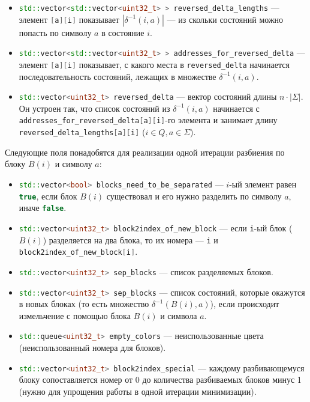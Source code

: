 \documentclass{article}
\begin{document}
\begin{itemize}
  \item \lstinline[language=C++]!std::vector<std::vector<uint32_t> > reversed_delta_lengths! --- элемент \lstinline[language=C++]![a][i]! показывает $|\delta^{-1}(i, a)|$ --- из скольки состояний можно попасть по символу $a$ в состояние $i$.
  \item \lstinline[language=C++]!std::vector<std::vector<uint32_t> > addresses_for_reversed_delta! --- элемент \lstinline[language=C++]![a][i]! показывает, с какого места в \lstinline[language=C++]!reversed_delta! начинается последовательность состояний, лежащих в множестве $\delta^{-1}(i, a)$.
  \item \lstinline[language=C++]!std::vector<uint32_t> reversed_delta! --- вектор состояний длины $n \cdot |\Sigma|$. Он устроен так, что список состояний из $\delta^{-1}(i, a)$ начинается с \lstinline[language=C++]!addresses_for_reversed_delta[a][i]!-го элемента и занимает длину \lstinline[language=C++]!reversed_delta_lengths[a][i]! ($i \in Q, a \in \Sigma$).
\end{itemize}
Следующие поля понадобятся для реализации одной итерации разбиения по блоку $B(i)$ и символу $a$:
\begin{itemize}
  \item \lstinline[language=C++]!std::vector<bool> blocks_need_to_be_separated! --- $i$-ый элемент равен \lstinline[language=C++]!true!, если блок $B(i)$ существовал и его нужно разделить по символу $a$, иначе \lstinline[language=C++]!false!.
  \item \lstinline[language=C++]!std::vector<uint32_t> block2index_of_new_block! --- если \lstinline[language=C++]!i!-ый блок ($B(i)$) разделяется на два блока, то их номера --- \lstinline[language=C++]!i! и \lstinline[language=C++]!block2index_of_new_block[i]!.
  \item \lstinline[language=C++]!std::vector<uint32_t> sep_blocks! --- список разделяемых блоков.
  \item \lstinline[language=C++]!std::vector<uint32_t> sep_blocks! --- список состояний, которые окажутся в новых блоках (то есть множество $\delta^{-1}(B(i), a)$), если происходит измельчение с помощью блока $B(i)$ и символа $a$.
  \item \lstinline[language=C++]!std::queue<uint32_t> empty_colors! --- неиспользованные цвета (неиспользованный номера для блоков).
  \item \lstinline[language=C++]!std::vector<uint32_t> block2index_special! --- каждому разбивающемуся блоку сопоставляется номер от 0 до количества разбиваемых блоков минус 1 (нужно для упрощения работы в одной итерации минимизации).
\end{itemize}
\end{document}
